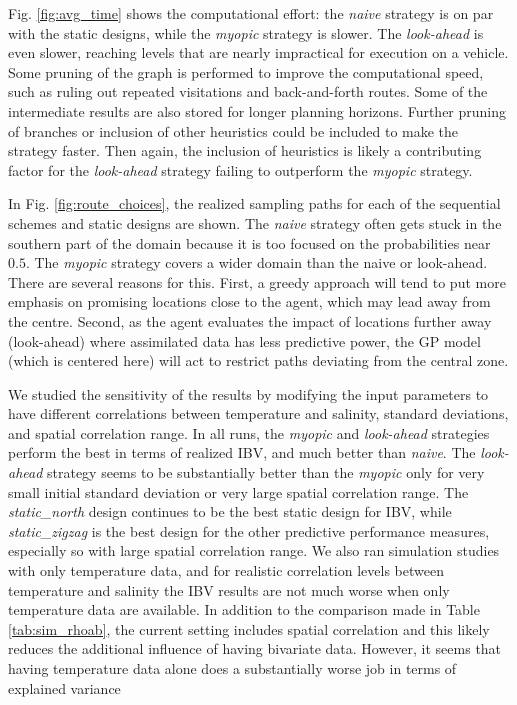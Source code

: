 \documentclass[aoas]{imsart}
\begin{document}
Fig. \ref{fig:avg_time} shows the computational effort: the
\textit{naive} strategy is on par with the static designs, while the
\textit{myopic} strategy is slower. The \textit{look-ahead} is even
slower, reaching levels that are nearly impractical for execution on a
vehicle. Some pruning of the graph is performed to improve the
computational speed, such as ruling out repeated visitations and
back-and-forth routes. Some of the intermediate results are also
stored for longer planning horizons. Further pruning of branches or
inclusion of other heuristics could be included to make the strategy
faster. Then again, the inclusion of heuristics is likely a
contributing factor for the \textit{look-ahead} strategy failing to
outperform the \textit{myopic} strategy.

In Fig. \ref{fig:route_choices}, the realized sampling paths for each
of the sequential schemes and static designs are shown. The
\textit{naive} strategy often gets stuck in the southern part of the
domain because it is too focused on the probabilities near $0.5$. The
\textit{myopic} strategy covers a wider domain than the naive or
look-ahead. There are several reasons for this. First, a greedy
approach will tend to put more emphasis on promising locations close to the
agent, which may lead away from the centre. Second, as the agent
evaluates the impact of locations further away (look-ahead) where
assimilated data has less predictive power, the GP model (which
is centered here) will act to restrict paths deviating from the
central zone.

We studied the sensitivity of the results by modifying the input parameters to have different correlations between temperature and salinity, standard deviations, and spatial correlation range.  In all runs,  the \textit{myopic} and \textit{look-ahead} strategies perform the best in terms of realized IBV, and much better than \textit{naive}. The \textit{look-ahead} strategy seems to be substantially better than the \textit{myopic} only for very small initial standard deviation or very large spatial correlation range. The \textit{static\_north} design continues to be the best static design for IBV, while \textit{static\_zigzag} is the best design for the other predictive performance measures, especially so with large spatial correlation range. We also ran simulation studies with only temperature data, and for realistic correlation levels between temperature and salinity the IBV results are not much worse when only temperature data are available. In addition to the comparison made in Table \ref{tab:sim_rhoab}, the current setting includes spatial correlation and this likely reduces the additional influence of having bivariate data. However, it seems that having temperature data alone does a substantially worse job in terms of explained variance
\end{document}
